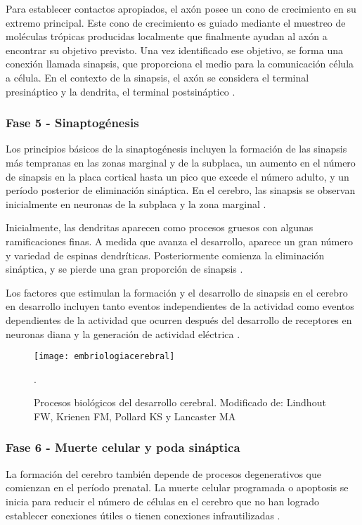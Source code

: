 Para establecer contactos apropiados, el axón posee un cono de crecimiento en
su extremo principal. Este cono de crecimiento es guiado mediante el muestreo
de moléculas trópicas producidas localmente que finalmente ayudan al axón a
encontrar su objetivo previsto. Una vez identificado ese objetivo, se forma una
conexión llamada sinapsis, que proporciona el medio para la comunicación célula
a célula. En el contexto de la sinapsis, el axón se considera el terminal
presináptico y la dendrita, el terminal postsináptico \cite{Gibb2018}.

\subsubsection{Fase 5 - Sinaptogénesis}
Los principios básicos de la sinaptogénesis incluyen la formación de las
sinapsis más tempranas en las zonas marginal y de la subplaca, un aumento en el
número de sinapsis en la placa cortical hasta un pico que excede el número
adulto, y un período posterior de eliminación sináptica. En el cerebro, las
sinapsis se observan inicialmente en neuronas de la subplaca y la zona marginal
\cite{Polin124}.

Inicialmente, las dendritas aparecen como procesos gruesos con algunas 
ramificaciones finas. A medida que avanza el desarrollo, aparece un gran número
y variedad de espinas dendríticas. Posteriormente comienza la eliminación
sináptica, y se pierde una gran proporción de sinapsis \cite{Polin124}.

Los factores que estimulan la formación y el desarrollo de sinapsis en el
cerebro en desarrollo incluyen tanto eventos independientes de la actividad
como eventos dependientes de la actividad que ocurren después del desarrollo de
receptores en neuronas diana y la generación de actividad eléctrica
\cite{Polin124}.

\begin{figure}[h]
    \centering
    \texttt{[image: embriologiacerebral]}
	\captionsetup{font=footnotesize}
    \caption{Procesos biológicos del desarrollo cerebral. Modificado de:
	Lindhout FW, Krienen FM, Pollard KS y Lancaster MA \cite{Lindhout2024}}.
    \label{fig:embriologiacerebral}
\end{figure}

\subsubsection{Fase 6 - Muerte celular y poda sináptica}
La formación del cerebro también depende de procesos degenerativos que
comienzan en el período prenatal. La muerte celular programada o apoptosis se
inicia para reducir el número de células en el cerebro que no han logrado
establecer conexiones útiles o tienen conexiones infrautilizadas
\cite{Gibb2018}.

